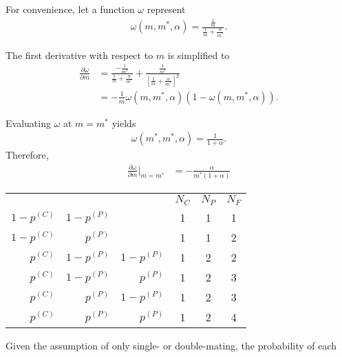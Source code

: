 For convenience, let a function $\omega$ represent
\begin{align*}
\omega(m,m^*,\alpha) = \frac{ \frac{1}{m} }{ \frac{1}{m}+\frac{\alpha}{m^*} }.
\end{align*}

The first derivative with respect to $m$ is simplified to
\begin{align*}
    \frac{\partial \omega}{\partial m} &= \frac{ -\frac{1}{m^2} }{ \frac{1}{m}+\frac{\alpha}{m^*} }+ \frac{ \frac{1}{m^3} }{ [\frac{1}{m}+\frac{\alpha}{m^*}]^2 }\\
    &=-\frac{1}{m}\omega(m,m^*,\alpha)(1-\omega(m,m^*,\alpha)).
\end{align*}

Evaluating $\omega$ at $m=m^*$ yields
\begin{align*}
    \omega(m^*,m^*,\alpha) = \frac{1}{1+\alpha}.
\end{align*}
Therefore,
\begin{align*}
  \frac{\partial \omega}{\partial m}|_{m=m^*} &=  -\frac{\alpha}{m^*(1+\alpha)} 
\end{align*}

\begin{center}
\begin{tabular}{ |r|r|r|c|c|c| } 
 \hline
             &             && $N_C$ & $N_P$ & $N_F$ \\ 
 $1-p^{(C)}$ & $1-p^{(P)}$ && 1     & 1     & 1 \\ 
 $1-p^{(C)}$ &   $p^{(P)}$ && 1     & 1     & 2 \\ 
   $p^{(C)}$ & $1-p^{(P)}$ & $1-p^{(P)}$ & 1     & 2     & 2 \\ 
   $p^{(C)}$ & $1-p^{(P)}$ & $p^{(P)}$ & 1     & 2     & 3 \\ 
   $p^{(C)}$ & $p^{(P)}$ & $1-p^{(P)}$ & 1     & 2     & 3 \\ 
   $p^{(C)}$ & $p^{(P)}$ & $p^{(P)}$ & 1     & 2     & 4 \\ 
 \hline
\end{tabular}
\label{tab:branching}
\end{center}







Given the assumption of only single- or double-mating, the probability of each 